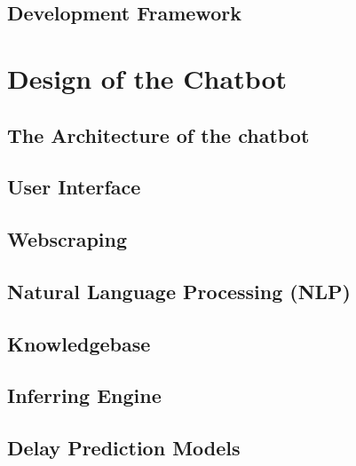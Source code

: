 \documentclass[11pt]{article}
\begin{document}

 
\subsection{Development Framework} \label{development-framework}


\section{Design of the Chatbot} \label{design}

 
\subsection{The Architecture of the chatbot} \label{architecture}

\subsection{User Interface} \label{user-interface}

\subsection{Webscraping} \label{webscraping}

\subsection{Natural Language Processing (NLP)} \label{nlp}

\subsection{Knowledgebase} \label{knowledgebase}

\subsection{Inferring Engine} \label{inference-engine}

\subsection{Delay Prediction Models} \label{delay-prediction}
\end{document}
